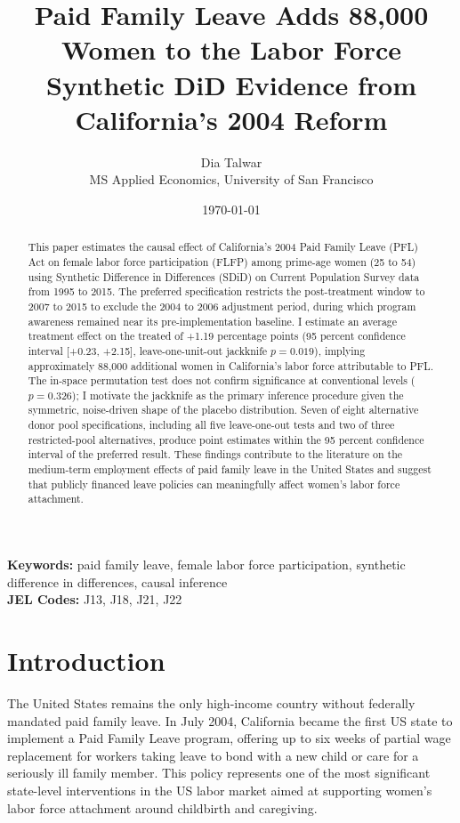 \documentclass[12pt, letterpaper]{article}
\title{\textbf{Paid Family Leave Adds 88,000 Women to the Labor Force\\ \large Synthetic DiD Evidence from California's 2004 Reform}}
\author{Dia Talwar \\ \small{MS Applied Economics, University of San Francisco}}
\date{\today}
\begin{document}
\maketitle

\begin{abstract}
\noindent This paper estimates the causal effect of California's 2004 Paid Family Leave (PFL) Act on female labor force participation (FLFP) among prime-age women (25 to 54) using Synthetic Difference in Differences (SDiD) on Current Population Survey data from 1995 to 2015. The preferred specification restricts the post-treatment window to 2007 to 2015 to exclude the 2004 to 2006 adjustment period, during which program awareness remained near its pre-implementation baseline. I estimate an average treatment effect on the treated of +1.19 percentage points (95 percent confidence interval [+0.23, +2.15], leave-one-unit-out jackknife $p = 0.019$), implying approximately 88,000 additional women in California's labor force attributable to PFL. The in-space permutation test does not confirm significance at conventional levels ($p = 0.326$); I motivate the jackknife as the primary inference procedure given the symmetric, noise-driven shape of the placebo distribution. Seven of eight alternative donor pool specifications, including all five leave-one-out tests and two of three restricted-pool alternatives, produce point estimates within the 95 percent confidence interval of the preferred result. These findings contribute to the literature on the medium-term employment effects of paid family leave in the United States and suggest that publicly financed leave policies can meaningfully affect women's labor force attachment.
\end{abstract}

\vspace{1em}
\noindent \textbf{Keywords:} paid family leave, female labor force participation, synthetic difference in differences, causal inference \\
\noindent \textbf{JEL Codes:} J13, J18, J21, J22

\newpage

\section{Introduction}

The United States remains the only high-income country without federally mandated paid family leave. In July 2004, California became the first US state to implement a Paid Family Leave program, offering up to six weeks of partial wage replacement for workers taking leave to bond with a new child or care for a seriously ill family member. This policy represents one of the most significant state-level interventions in the US labor market aimed at supporting women's labor force attachment around childbirth and caregiving.
\end{document}

